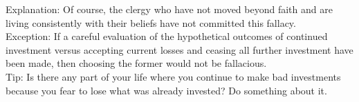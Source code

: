 \documentclass[a4paper,12pt,single,pdftex]{scrbook}
\begin{document}
{    
      Explanation: Of course, the clergy who have not moved beyond faith and are living consistently with their beliefs have not committed this fallacy.
    \\

    
      Exception: If a careful evaluation of the hypothetical outcomes of continued investment versus accepting current losses and ceasing all further investment have been made, then choosing the former would not be fallacious.
    \\

    
      Tip: Is there any part of your life where you continue to make bad investments because you fear to lose what was already invested? Do something about it.
    \\

    
      
    \\

  }
\end{document}
